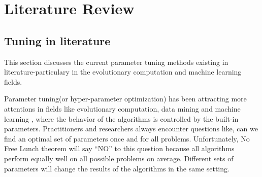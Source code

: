 \section{Literature Review} 

\subsection{Tuning in literature}
This section discusses the current parameter tuning methods existing in literature-particulary
in the evolutionary computation and machine learning fields.


Parameter tuning(or hyper-parameter optimization) has been attracting more attentions in fields like evolutionary
computation, data mining and  machine learning \cite{lobo2007parameter,Bergstra2012}, where the behavior of the algorithms is controlled by the built-in parameters.  Practitioners and researchers always encounter questions like, can we find an optimal set of parameters once and for all problems. Unfortunately, No Free Lunch theorem \cite{wolpert1997no} will say ``NO'' to this question because all algorithms perform equally well on all possible problems on average. Different sets of parameters will change the results of the algorithms in the same setting.

